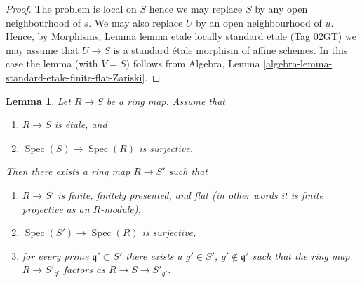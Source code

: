 \documentclass{amsart}
\theoremstyle{plain}
\newtheorem{lemma}[subsection]{Lemma}
\theoremstyle{definition}
\theoremstyle{remark}
\numberwithin{equation}{subsection}
\def\Spec{\mathop{\mathrm{Spec}}}
\begin{document}
\begin{proof}
The problem is local on $S$ hence we may replace $S$ by any
open neighbourhood of $s$.
We may also replace $U$ by an open neighbourhood of $u$.
Hence, by Morphisms, Lemma \href{https://stacks.math.columbia.edu/tag/02GT}{lemma etale locally standard etale (Tag 02GT)}
we may assume that
$U \to S$ is a standard \'etale morphism of affine schemes.
In this case the lemma (with $V = S$) follows from
Algebra, Lemma \ref{algebra-lemma-standard-etale-finite-flat-Zariski}.
\end{proof}


\begin{lemma}
\label{algebra-lemma-etale-finite-flat-zariski}
Let $R \to S$ be a ring map.
Assume that
\begin{enumerate}
\item $R \to S$ is \'etale, and
\item $\Spec(S) \to \Spec(R)$ is surjective.
\end{enumerate}
Then there exists a ring map $R \to S'$ such that
\begin{enumerate}
\item $R \to S'$ is finite, finitely presented, and flat
(in other words it is finite projective as an $R$-module),
\item $\Spec(S') \to \Spec(R)$ is surjective,
\item for every prime $\mathfrak q' \subset S'$ there exists a
$g' \in S'$, $g' \not \in \mathfrak q'$ such that
the ring map $R \to S'_{g'}$ factors as $R \to S \to S'_{g'}$.
\end{enumerate}
\end{lemma}
\end{document}
